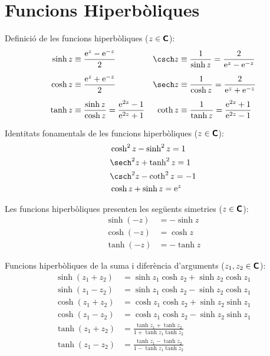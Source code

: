 \section{Funcions Hiperbòliques}

Definició de les funcions hiperbòliques ($z\in{\ensuremath{\boldsymbol{\mathsf{C}}}}$):
\begin{subequations}
\begin{align}
    \sinh z&\equiv \frac{\eu^z - \eu^{-z}}{2} & \csch z &\equiv\frac{1}{\sinh z} =
    \frac{2}{\eu^z - \eu^{-z}}\\[1ex]
    \cosh z&\equiv \frac{\eu^z + \eu^{-z}}{2} & \sech z &\equiv\frac{1}{\cosh z} =
    \frac{2}{\eu^z + \eu^{-z}}\\[1ex]
    \tanh z&\equiv \frac{\sinh z}{\cosh z} = \frac{\eu^{2z}-1}{\eu^{2z}+1} &
    \coth z &\equiv\frac{1}{\tanh z} = \frac{\eu^{2z}+1}{\eu^{2z}-1}
\end{align}
\end{subequations}

Identitats fonamentals de les funcions hiperbòliques
($z\in{\ensuremath{\boldsymbol{\mathsf{C}}}}$):
\begin{align}
    &\cosh^2 z - \sinh^2 z = 1 \\
    &\sech^2 z + \tanh^2 z = 1 \\
    &\csch^2 z - \coth^2 z = -1 \\
    &\cosh z + \sinh z = \eu^z
\end{align}

Les funcions hiperbòliques presenten les següents simetries
($z\in{\ensuremath{\boldsymbol{\mathsf{C}}}}$):
\begin{subequations}
\begin{align}
    \sinh (-z) &= -\sinh z \\
    \cosh (-z) &= \cosh z\\
    \tanh (-z) &= -\tanh z
\end{align}
\end{subequations}

Funcions hiperbòliques de la suma i diferència d'arguments ($z_1,
z_2\in{\ensuremath{\boldsymbol{\mathsf{C}}}}$):
\begin{subequations}
\begin{align}
    \sinh(z_1+z_2) &= \sinh z_1 \cosh z_2 + \sinh z_2\cosh z_1\\[1ex]
    \sinh(z_1-z_2) &= \sinh z_1 \cosh z_2 - \sinh z_2\cosh z_1\\[1ex]
    \cosh(z_1+z_2) &= \cosh z_1 \cosh z_2 + \sinh z_2\sinh z_1\\[1ex]
    \cosh(z_1-z_2) &= \cosh z_1 \cosh z_2 - \sinh z_2\sinh z_1\\[1ex]
    \tanh(z_1+z_2) &=\frac{\tanh z_1+\tanh z_2}{1+\tanh z_1\tanh z_2}\\[1ex]
    \tanh(z_1-z_2) &=\frac{\tanh z_1-\tanh z_2}{1-\tanh z_1\tanh z_2}
\end{align}
\end{subequations}

